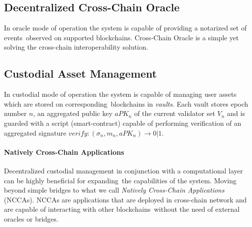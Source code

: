 \subsection{Decentralized Cross-Chain Oracle}\label{subsec:cross-chain-oracle}

In oracle mode of operation the system is capable of providing a notarized set of events\
observed on supported blockchains.
Cross-Chain Oracle is a simple yet solving the cross-chain interoperability solution.

\subsection{Custodial Asset Management}\label{subsec:custodial-asset-management}

In custodial mode of operation the system is capable of managing user assets which are stored on corresponding\
blockchains in \emph{vaults}.
Each vault stores epoch number $n$, an aggregated public key $aPK_n$ of the current validator set $V_n$ and
is guarded with a script (smart-contract) capable of performing verification of
an aggregated signature ${verify: (\sigma_n, m_n, aPK_n) \rightarrow 0 | 1}$.

\paragraph{Natively Cross-Chain Applications}

Decentralized custodial management in conjunction with a computational layer can be highly beneficial for expanding\
the capabilities of the system.
Moving beyond simple bridges to what we call \emph{Natively Cross-Chain Applications} (NCCAs).
NCCAs are applications that are deployed in cross-chain network and are capable of interacting with other blockchains\
without the need of external oracles or bridges.
